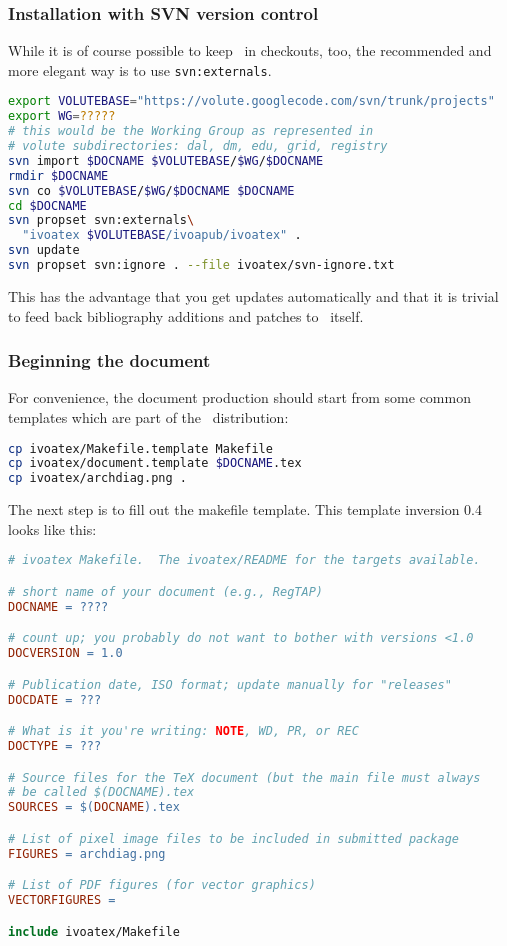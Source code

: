 \documentclass[11pt,a4paper]{ivoa}
\begin{document}
\subsubsection{Installation with SVN version control}

While it is of course possible to keep \ivoatex\ in checkouts, too,
the recommended and more elegant way is to use \texttt{svn:externals}.

\begin{lstlisting}[language=sh]
export VOLUTEBASE="https://volute.googlecode.com/svn/trunk/projects"
export WG=?????
# this would be the Working Group as represented in
# volute subdirectories: dal, dm, edu, grid, registry
svn import $DOCNAME $VOLUTEBASE/$WG/$DOCNAME
rmdir $DOCNAME
svn co $VOLUTEBASE/$WG/$DOCNAME $DOCNAME
cd $DOCNAME
svn propset svn:externals\
  "ivoatex $VOLUTEBASE/ivoapub/ivoatex" .
svn update
svn propset svn:ignore . --file ivoatex/svn-ignore.txt
\end{lstlisting}

This has the advantage that you get updates automatically and that it is 
trivial to feed back bibliography additions and patches to \ivoatex\
itself.

\subsubsection{Beginning the document}
\label{sect:beginning}

For convenience, the document production should start from some common
templates which are part of the \ivoatex\ distribution:

\begin{lstlisting}[language=sh]
cp ivoatex/Makefile.template Makefile
cp ivoatex/document.template $DOCNAME.tex
cp ivoatex/archdiag.png .
\end{lstlisting}

The next step is to fill out the makefile template.  This template
inversion 0.4 looks like this:

\begin{lstlisting}[language=make]
# ivoatex Makefile.  The ivoatex/README for the targets available.

# short name of your document (e.g., RegTAP)
DOCNAME = ????

# count up; you probably do not want to bother with versions <1.0
DOCVERSION = 1.0

# Publication date, ISO format; update manually for "releases"
DOCDATE = ???

# What is it you're writing: NOTE, WD, PR, or REC
DOCTYPE = ???

# Source files for the TeX document (but the main file must always
# be called $(DOCNAME).tex
SOURCES = $(DOCNAME).tex

# List of pixel image files to be included in submitted package 
FIGURES = archdiag.png

# List of PDF figures (for vector graphics)
VECTORFIGURES = 

include ivoatex/Makefile
\end{lstlisting}
\end{document}
